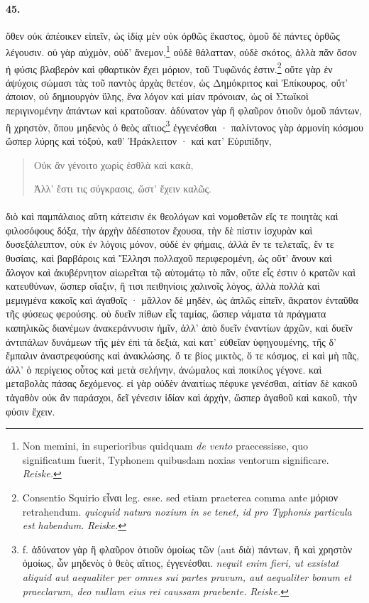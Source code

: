 \documentclass[a4paper, 11pt, oneside, polutonikogreek, german, landscape]{article}
\begin{document}
\paragraph{45.}
ὅθεν οὐκ ἀπέοικεν εἰπεῖν, ὡς ἰδίᾳ μὲν οὐκ ὀρθῶς ἕκαστος, ὁμοῦ δὲ πάντες ὀρθῶς λέγουσιν. οὐ γὰρ αὐχμὸν, οὐδ' ἄνεμον,\footnote{Non memini, in superioribus quidquam \emph{de vento} praecessisse, quo significatum fuerit, Typhonem quibusdam noxias ventorum significare. \emph{Reiske.}} οὐδὲ θάλατταν, οὐδὲ σκότος, ἀλλὰ πᾶν ὅσον ἡ φύσις βλαβερὸν καὶ φθαρτικὸν ἔχει μόριον, τοῦ Τυφῶνός ἐστιν.\footnote{Consentio Squirio εἶναι leg. esse. sed etiam praeterea comma ante μόριον retrahendum. \emph{quicquid natura noxium in se tenet, id pro Typhonis particula est habendum.} \emph{Reiske.}} οὔτε γὰρ ἐν ἀψύχοις σώμασι τὰς τοῦ παντὸς ἀρχὰς θετέον, ὡς Δημόκριτος καὶ Ἐπίκουρος, οὔτ' ἀποιον, οὐ δημιουργὸν ὕλης, ἕνα λόγον καὶ μίαν πρόνοιαν, ὡς οἱ Στωϊκοὶ περιγινομένην ἁπάντων καὶ κρατοῦσαν. ἀδύνατον γὰρ ἢ φλαῦρον ὁτιοῦν ὁμοῦ πάντων, ἢ χρηστὸν, ὅπου μηδενὸς ὁ θεὸς αἴτιος\footnote{f. ἀδύνατον γὰρ ἢ φλαῦρον ὁτιοῦν ὁμοίως τῶν (aut διὰ) πάντων, ἢ καὶ χρηστὸν ὁμοίως, ὧν μηδενὸς ὁ θεὸς αἴτιος, ἐγγενέσθαι. \emph{nequit enim fieri, ut exsistat aliquid aut aequaliter per omnes sui partes pravum, aut aequaliter bonum et praeclarum, deo nullam eius rei caussam praebente.} \emph{Reiske.}} ἐγγενέσθαι · παλίντονος γὰρ ἁρμονίη κόσμου ὥσπερ λύρης καὶ τόξού, καθ' Ἡράκλειτον · καὶ κατ' Εὐριπίδην,
\begin{quotation}\small
Οὐκ ἂν γένοιτο χωρὶς ἐσθλὰ καὶ κακὰ,

Ἀλλ' ἔστι τις σύγκρασις, ὥστ' ἔχειν καλῶς.
\end{quotation}
\paragraph{}
διὸ καὶ παμπάλαιος αὕτη κάτεισιν ἐκ θεολόγων καὶ νομοθετῶν εἴς τε ποιητὰς καὶ φιλοσόφους δόξα, τὴν ἀρχὴν ἀδέσποτον ἔχουσα, τὴν δὲ πίστιν ἰσχυρὰν καὶ δυσεξάλειπτον, οὐκ ἐν λόγοις μόνον, οὐδὲ ἐν φήμαις, ἀλλὰ ἔν τε τελεταῖς, ἔν τε θυσίαις, καὶ βαρβάροις καὶ Ἕλλησι πολλαχοῦ περιφερομένη, ὡς οὔτ' ἄνουν καὶ ἄλογον καὶ ἀκυβέρνητον αἰωρεῖται τῷ αὐτομάτῳ τὸ πᾶν, οὔτε εἷς ἐστιν ὁ κρατῶν καὶ κατευθύνων, ὥσπερ οἴαξιν, ἤ τισι πειθηνίοις χαλινοῖς λόγος, ἀλλὰ πολλὰ καὶ μεμιγμένα κακοῖς καὶ ἀγαθοῖς · μᾶλλον δὲ μηδὲν, ὡς ἁπλῶς εἰπεῖν, ἄκρατον ἐνταῦθα τῆς φύσεως φερούσης. οὐ δυεῖν πίθων εἷς ταμίας, ὥσπερ νάματα τὰ πράγματα καπηλικῶς διανέμων ἀνακεράννυσιν ἡμῖν, ἀλλ' ἀπὸ δυεῖν ἐναντίων ἀρχῶν, καὶ δυεῖν ἀντιπάλων δυνάμεων τῆς μὲν ἐπὶ τὰ δεξιὰ, καὶ κατ' εὐθεῖαν ὑφηγουμένης, τῆς δ' ἔμπαλιν ἀναστρεφούσης καὶ ἀνακλώσης. ὅ τε βίος μικτὸς, ὅ τε κόσμος, εἰ καὶ μὴ πᾶς, ἀλλ' ὁ περίγειος οὗτος καὶ μετὰ σελήνην, ἀνώμαλος καὶ ποικίλος γέγονε. καὶ μεταβολὰς πάσας δεχόμενος. εἰ γὰρ οὐδὲν ἀναιτίως πέφυκε γενέσθαι, αἰτίαν δὲ κακοῦ τἀγαθὸν οὐκ ἂν παράσχοι, δεῖ γένεσιν ἰδίαν καὶ ἀρχὴν, ὥσπερ ἀγαθοῦ καὶ κακοῦ, τὴν φύσιν ἔχειν.
\end{document}
